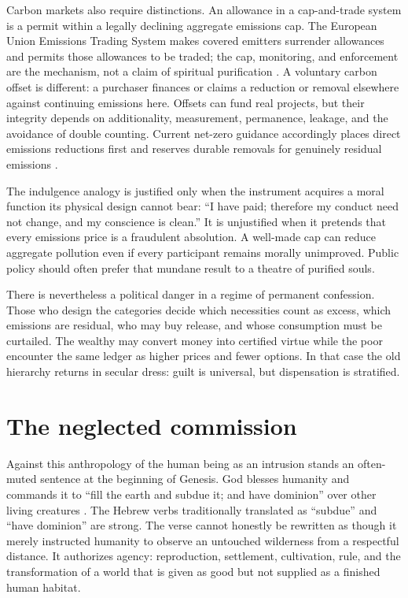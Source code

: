 ﻿\documentclass[12pt,a4paper]{book}
\begin{document}
Carbon markets also require distinctions.  An allowance in a cap-and-trade
system is a permit within a legally declining aggregate emissions cap.  The
European Union Emissions Trading System makes covered emitters surrender
allowances and permits those allowances to be traded; the cap, monitoring,
and enforcement are the mechanism, not a claim of spiritual purification
\cite{EUETS}.  A voluntary carbon offset is different: a purchaser finances or
claims a reduction or removal elsewhere against continuing emissions here.
Offsets can fund real projects, but their integrity depends on additionality,
measurement, permanence, leakage, and the avoidance of double counting.
Current net-zero guidance accordingly places direct emissions reductions
first and reserves durable removals for genuinely residual emissions
\cite{OxfordOffsettingPrinciples2024}.

The indulgence analogy is justified only when the instrument acquires a moral
function its physical design cannot bear: ``I have paid; therefore my conduct
need not change, and my conscience is clean.''  It is unjustified when it
pretends that every emissions price is a fraudulent absolution.  A well-made
cap can reduce aggregate pollution even if every participant remains morally
unimproved.  Public policy should often prefer that mundane result to a theatre
of purified souls.

There is nevertheless a political danger in a regime of permanent confession.
Those who design the categories decide which necessities count as excess,
which emissions are residual, who may buy release, and whose consumption must
be curtailed.  The wealthy may convert money into certified virtue while the
poor encounter the same ledger as higher prices and fewer options.  In that
case the old hierarchy returns in secular dress: guilt is universal, but
dispensation is stratified.

\section{The neglected commission}

Against this anthropology of the human being as an intrusion stands an
often-muted sentence at the beginning of Genesis.  God blesses humanity and
commands it to ``fill the earth and subdue it; and have dominion'' over other
living creatures \cite[Gen.~1:28]{NRSVue2021}.  The Hebrew verbs traditionally
translated as ``subdue'' and ``have dominion'' are strong.  The verse cannot
honestly be rewritten as though it merely instructed humanity to observe an
untouched wilderness from a respectful distance.  It authorizes agency:
reproduction, settlement, cultivation, rule, and the transformation of a
world that is given as good but not supplied as a finished human habitat.
\end{document}
